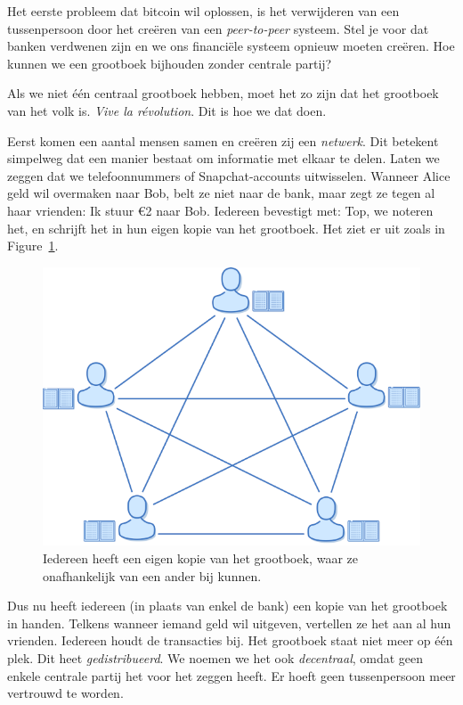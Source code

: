 \documentclass[
  letterpaper,
]{scrbook}
\begin{document}
Het eerste probleem dat bitcoin wil oplossen, is het verwijderen van een
tussenpersoon door het creëren van een \emph{peer-to-peer} systeem. Stel
je voor dat banken verdwenen zijn en we ons financiële systeem opnieuw
moeten creëren. Hoe kunnen we een grootboek bijhouden zonder centrale
partij?

Als we niet één centraal grootboek hebben, moet het zo zijn dat het
grootboek van het volk is. \emph{Vive la révolution}. Dit is hoe we dat
doen.

Eerst komen een aantal mensen samen en creëren zij een \emph{netwerk}.
Dit betekent simpelweg dat een manier bestaat om informatie met elkaar
te delen. Laten we zeggen dat we telefoonnummers of Snapchat-accounts
uitwisselen. Wanneer Alice geld wil overmaken naar Bob, belt ze niet
naar de bank, maar zegt ze tegen al haar vrienden: Ik stuur €2 naar Bob.
Iedereen bevestigt met: Top, we noteren het, en schrijft het in hun
eigen kopie van het grootboek. Het ziet er uit zoals in
Figure~\ref{fig-figure3}.

\begin{figure}

{\centering \includegraphics{./images/fig3.png}

}

\caption{\label{fig-figure3}Iedereen heeft een eigen kopie van het
grootboek, waar ze onafhankelijk van een ander bij kunnen.}

\end{figure}

Dus nu heeft iedereen (in plaats van enkel de bank) een kopie van het
grootboek in handen. Telkens wanneer iemand geld wil uitgeven, vertellen
ze het aan al hun vrienden. Iedereen houdt de transacties bij. Het
grootboek staat niet meer op één plek. Dit heet \emph{gedistribueerd}.
We noemen we het ook \emph{decentraal}, omdat geen enkele centrale
partij het voor het zeggen heeft. Er hoeft geen tussenpersoon meer
vertrouwd te worden.
\end{document}
